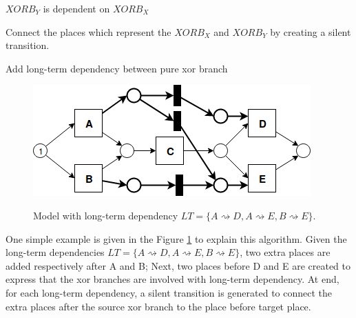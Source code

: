 \begin{algorithm}[!ht]
	\SetAlgoLined
	$XORB_Y$ is dependent on $XORB_X$\;
	
	Connect the places which represent the $XORB_X$ and $XORB_Y$ by creating a silent transition.
	\caption{Add long-term dependency between pure xor branch}
	\label{alg: Adding method}
\end{algorithm}
\begin{figure}
	\includegraphics[width=\textwidth]{figures/algorithm/LT_Seq_01_Silent_01.png}
	\label{fig:add-algorithm-example}
	\caption{Model with long-term dependency $LT=\{ A\rightsquigarrow D, A\rightsquigarrow E, B\rightsquigarrow E\}. $ }
\end{figure}
One simple example is given in the Figure \ref{fig:add-algorithm-example} to explain this algorithm. Given the long-term dependencies $LT=\{ A\rightsquigarrow D, A\rightsquigarrow E, B\rightsquigarrow E\}$, two extra places are added respectively after A and B; Next, two places before D and E are created to express that the xor branches are involved with long-term dependency. At end, for each long-term dependency, a silent transition is generated to connect the extra places after the source xor branch to the place before target place. 

